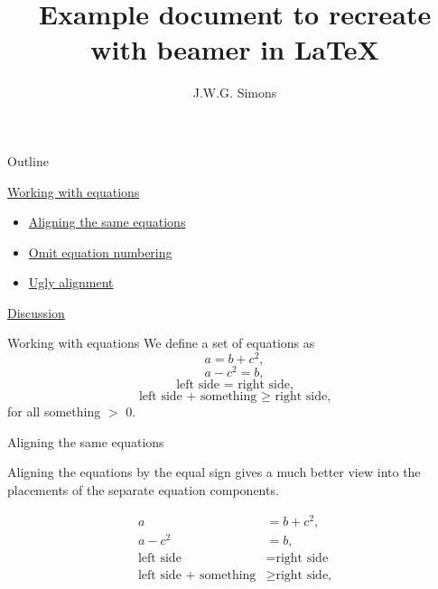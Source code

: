 \documentclass[8pt]{beamer}
\title{Example document to recreate with beamer in \LaTeX}
\author{J.W.G. Simons}
\date{}
\begin{document}
\begin{frame}
\titlepage
\centering
{}
\linebreak
{}
\end{frame}

\begin{frame}{Outline}

\hyperlink{wwe}{Working with equations}
\begin{itemize}
  \item[] \hyperlink{atse}{Aligning the same equations}
  \item[] \hyperlink{oen}{Omit equation numbering}
  \item[] \hyperlink{ua}{Ugly alignment}
\end{itemize}
\bigskip
\bigskip
\hyperlink{disc}{Discussion}


\end{frame}

\begin{frame}[label = wwe]{Working with equations}
We define a set of equations as 
\begin{equation}
 a = b + c^2, 
\end{equation}
\begin{equation}
 a - c^2 = b, 
\end{equation}
\begin{equation}
\text{left side = right side,} 
\end{equation}
\begin{equation}
\text{left side + something $\geq$ right side,}
\end{equation}
for all something $>$ 0.
\end{frame}

\begin{frame}[label = atse]{Aligning the same equations}

Aligning the equations by the equal sign gives a much better view into the placements of the separate equation components.

\begin{align} 
a &= b + c^2, \\ 
a - c^2 &= b, \\
\text{left side} &= \text{right side} \\ 
\text{left side + something} &\geq \text{right side,}
\end{align}

\end{frame}
\end{document}
